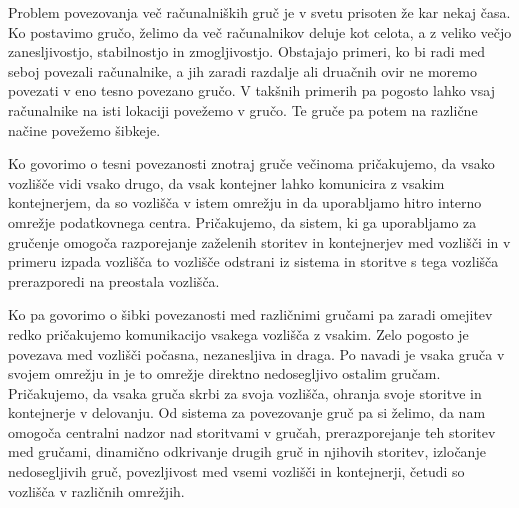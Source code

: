 \documentclass[a4paper, 12pt]{book}
\begin{document}
Problem povezovanja več računalniških gruč je v svetu prisoten že kar nekaj časa.
Ko postavimo gručo, želimo da več računalnikov deluje kot celota, a z veliko večjo zanesljivostjo, stabilnostjo in zmogljivostjo.
Obstajajo primeri, ko bi radi med seboj povezali računalnike, a jih zaradi razdalje ali druačnih ovir ne moremo povezati v eno tesno povezano gručo.
V takšnih primerih pa pogosto lahko vsaj računalnike na isti lokaciji povežemo v gručo.
Te gruče pa potem na različne načine povežemo šibkeje.

Ko govorimo o tesni povezanosti znotraj gruče večinoma pričakujemo, da vsako vozlišče vidi vsako drugo, da vsak kontejner lahko komunicira z vsakim kontejnerjem, da so vozlišča v istem omrežju in da uporabljamo hitro interno omrežje podatkovnega centra. 
Pričakujemo, da sistem, ki ga uporabljamo za gručenje omogoča razporejanje zaželenih storitev in kontejnerjev med vozlišči in v primeru izpada vozlišča to vozlišče odstrani iz sistema in storitve s tega vozlišča prerazporedi na preostala vozlišča.

Ko pa govorimo o šibki povezanosti med različnimi gručami pa zaradi omejitev redko pričakujemo komunikacijo vsakega vozlišča z vsakim.
Zelo pogosto je povezava med vozlišči počasna, nezanesljiva in draga.
Po navadi je vsaka gruča v svojem omrežju in je to omrežje direktno nedosegljivo ostalim gručam.
Pričakujemo, da vsaka gruča skrbi za svoja vozlišča, ohranja svoje storitve in kontejnerje v delovanju.
Od sistema za povezovanje gruč pa si želimo, da nam omogoča centralni nadzor nad storitvami v gručah, prerazporejanje teh storitev med gručami, dinamično odkrivanje drugih gruč in njihovih storitev, izločanje nedosegljivih gruč, povezljivost med vsemi vozlišči in kontejnerji, četudi so vozlišča v različnih omrežjih.
\end{document}
